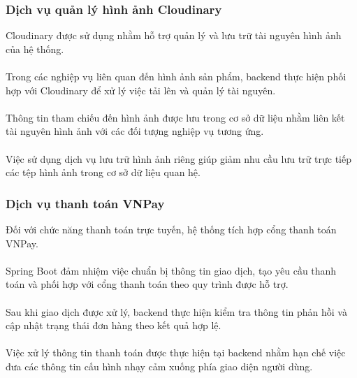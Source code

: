 \documentclass{report}
\begin{document}
\subsubsection{Dịch vụ quản lý hình ảnh Cloudinary}
Cloudinary được sử dụng nhằm hỗ trợ
quản lý và lưu trữ tài nguyên hình
ảnh của hệ thống.\\\\
Trong các nghiệp vụ liên quan đến
hình ảnh sản phẩm, backend thực hiện
phối hợp với Cloudinary để xử lý
việc tải lên và quản lý tài nguyên.\\\\
Thông tin tham chiếu đến hình ảnh
được lưu trong cơ sở dữ liệu nhằm
liên kết tài nguyên hình ảnh với
các đối tượng nghiệp vụ tương ứng.\\\\
Việc sử dụng dịch vụ lưu trữ hình
ảnh riêng giúp giảm nhu cầu lưu
trữ trực tiếp các tệp hình ảnh
trong cơ sở dữ liệu quan hệ.

\subsubsection{Dịch vụ thanh toán VNPay}
Đối với chức năng thanh toán trực
tuyến, hệ thống tích hợp cổng thanh
toán VNPay.\\\\
Spring Boot đảm nhiệm việc chuẩn
bị thông tin giao dịch, tạo yêu
cầu thanh toán và phối hợp với
cổng thanh toán theo quy trình
được hỗ trợ.\\\\
Sau khi giao dịch được xử lý,
backend thực hiện kiểm tra thông
tin phản hồi và cập nhật trạng
thái đơn hàng theo kết quả hợp lệ.\\\\
Việc xử lý thông tin thanh toán
được thực hiện tại backend nhằm
hạn chế việc đưa các thông tin
cấu hình nhạy cảm xuống phía
giao diện người dùng.
\end{document}
